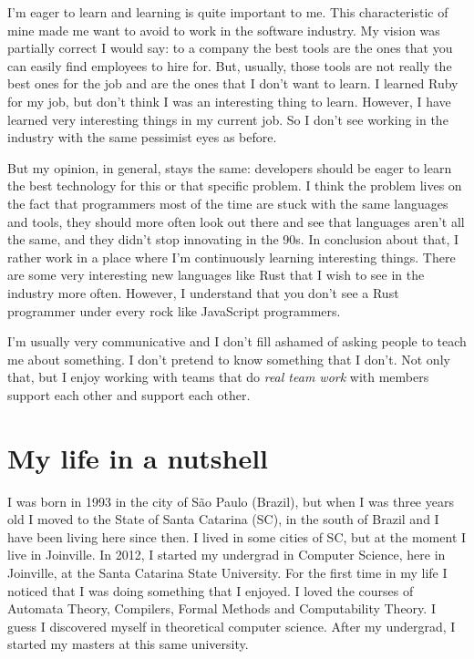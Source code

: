\documentclass[11pt,a4paper,sans]{moderncv}
\begin{document}
\medskip

I'm eager to learn and learning is quite important to me.
This characteristic of mine made me want to avoid to work in the software industry.
My vision was partially correct I would say:
to a company the best tools are the ones that you can easily find employees to hire for.
But, usually, those tools are not really the best ones for the job and are the ones that I don't want to learn.
I learned Ruby for my job, but don't think I was an interesting thing to learn.
However, I have learned very interesting things in my current job.
So I don't see working in the industry with the same pessimist eyes as before.

\medskip

But my opinion, in general, stays the same: developers should be eager to learn the best technology for this or that specific problem.
I think the problem lives on the fact that programmers most of the time are stuck with the same languages and tools, they should more often look out there and see that languages aren't all the same, and they didn't stop innovating in the 90s.
In conclusion about that, I rather work in a place where I'm continuously learning interesting things.
There are some very interesting new languages like Rust that I wish to see in the industry more often.
However, I understand that you don't see a Rust programmer under every rock like JavaScript programmers.

\medskip

I'm usually very communicative and I don't fill ashamed of asking people to teach me about something.
I don't pretend to know something that I don't.
Not only that, but I enjoy working with teams that do \textit{real team work} with members support each other and support each other.

\section{My life in a nutshell}
I was born in 1993 in the city of São Paulo (Brazil), but when I was three years old I moved to the State of Santa Catarina (SC), in the south of Brazil and I have been living here since then.
I lived in some cities of SC, but at the moment I live in Joinville.
In 2012, I started my undergrad in Computer Science, here in Joinville, at the Santa Catarina State University.
For the first time in my life I noticed that I was doing something that I enjoyed.
I loved the courses of Automata Theory, Compilers, Formal Methods and Computability Theory.
I guess I discovered myself in theoretical computer science.
After my undergrad, I started my masters at this same university.
\end{document}
